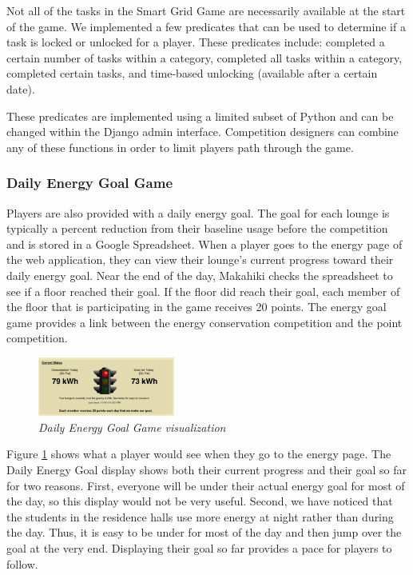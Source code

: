 \documentclass{acm_proc_article-sp}
\begin{document}
Not all of the tasks in the Smart Grid Game are necessarily available at the start of the game. We implemented a few predicates that can be used to determine if a task is locked or unlocked for a player. These predicates include: completed a certain number of tasks within a category, completed all tasks within a category, completed certain tasks, and time-based unlocking (available after a certain date).

These predicates are implemented using a limited subset of Python and can be changed within the Django admin interface. Competition designers can combine any of these functions in order to limit players path through the game.

\subsubsection{Daily Energy Goal Game}
\label{sys:goal-game}

Players are also provided with a daily energy goal. The goal for each lounge is typically a percent reduction from their baseline usage before the competition and is stored in a Google Spreadsheet. When a player goes to the energy page of the web application, they can view their lounge's current progress toward their daily energy goal. Near the end of the day, Makahiki checks the spreadsheet to see if a floor reached their goal. If the floor did reach their goal, each member of the floor that is participating in the game receives 20 points. The energy goal game provides a link between the energy conservation competition and the point competition.

\begin{figure}[t!]
  \center
  \includegraphics[width=0.4\textwidth]{daily-energy-goal-game.eps}
  \caption{\em \small Daily Energy Goal Game visualization}
  \label{fig:DailyEnergyGoal}
\end{figure}

Figure \ref{fig:DailyEnergyGoal} shows what a player would see when they go to the energy page. The Daily Energy Goal display shows both their current progress and their goal so far for two reasons. First, everyone will be under their actual energy goal for most of the day, so this display would not be very useful. Second, we have noticed that the students in the residence halls use more energy at night rather than during the day. Thus, it is easy to be under for most of the day and then jump over the goal at the very end. Displaying their goal so far provides a pace for players to follow. 
\end{document}
